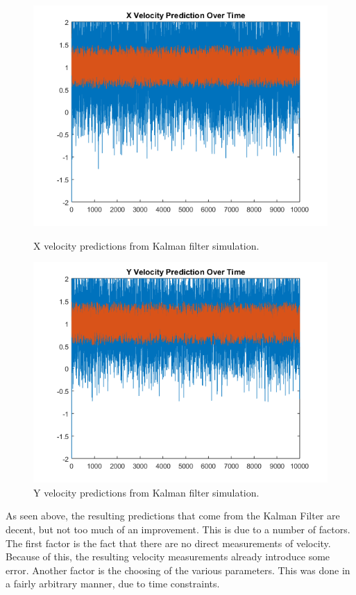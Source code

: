 \begin{figure}[ht!]
\begin{minipage}{.5\textwidth}
  \centering
\includegraphics[scale=0.5]{img/kf_xvel.png}
\caption{X velocity predictions from Kalman filter simulation.}
\label{fig:kf_xpos}
\end{minipage}
\begin{minipage}{0.5\textwidth}
\centering
\includegraphics[scale=0.5]{img/kf_yvel.png}
\caption{Y velocity predictions from Kalman filter simulation.}
\label{fig:kf_ypos}
\end{minipage}
\end{figure}\par
As seen above, the resulting predictions that come from the Kalman Filter are
decent, but not too much of an improvement. This is due to a number of factors.
The first factor is the fact that there are no direct measurements of velocity.
Because of this, the resulting velocity measurements already introduce some error.
Another factor is the choosing of the various parameters. This was done in a fairly
arbitrary manner, due to time constraints.
